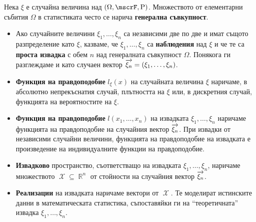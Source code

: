 \documentclass{../../common/topic}
\begin{document}
\begin{definition}[Извадки]
  Нека \( \xi \) е случайна величина над \( (\Omega, \mscrF, \Prob) \). Множеството от елементарни събития \( \Omega \) в статистиката често се нарича \textbf{генерална съвкупност}.

  \begin{itemize}
    \item Ако случайните величини \( \xi_1, \ldots, \xi_n \) са независими две по две и имат същото разпределение като \( \xi \), казваме, че \( \xi_1, \ldots, \xi_n \) са \textbf{наблюдения} над \( \xi \) и че те са \textbf{проста извадка} с обем \( n \) над генералната съвкупност \( \Omega \). Понякога ги разглеждаме и като случаен вектор \( \overrightarrow{\xi_n} = (\xi_1, \ldots, \xi_n) \).
    \item \textbf{Функция на правдоподобие} \( l_\xi(x) \) на случайната величина \( \xi \) наричаме, в абсолютно непрекъснатия случай, плътността на \( \xi \) или, в дискретния случай, функцията на вероятностите на \( \xi \).
    \item \textbf{Функция на правдоподобие} \( l(x_1, \ldots, x_n) \) на извадката \( \xi_1, \ldots, \xi_n \) наричаме функцията на правдоподобие на случайния вектор \( \overrightarrow{\xi_n} \). При извадки от независими случайни величини, функцията на правдоподобие на извадката е произведение на индивидуалните функции на правдоподобие.
    \item \textbf{Извадково} пространство, съответстващо на извадката \( \xi_1, \ldots, \xi_n \), наричаме множеството \( \mscrX \subseteq \BbbR^n \) от стойности на случайния вектор \( \overrightarrow{\xi_n} \).
    \item \textbf{Реализации} на извадката наричаме вектори от \( \mscrX \). Те моделират истинските данни в математическата статистика, съпоставяйки ги на \enquote{теоретичната} извадка \( \xi_1, \ldots, \xi_n \).
  \end{itemize}
\end{definition}
\end{document}
